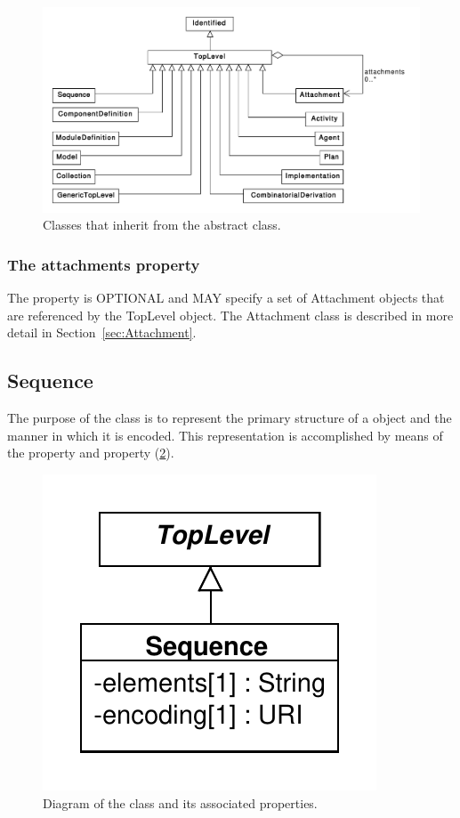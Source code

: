 \begin{figure}[ht]
\begin{center}
\includegraphics[width=\textwidth]{uml/toplevel}
\caption[]{Classes that inherit from the  abstract class.}
\label{uml:toplevel}
\end{center}
\end{figure}


\subsubsection*{The attachments property}
\label{sec:attachments}
The  property is OPTIONAL and MAY specify a set of Attachment objects that are referenced by the TopLevel object. The Attachment class is described in more detail in Section~\ref{sec:Attachment}.

\subsection{Sequence}
\label{sec:Sequence}
The purpose of the  class is to represent the primary structure of a  object and the manner in which it is encoded. This representation is accomplished  by means of the  property and  property (\ref{uml:sequence}).

\begin{figure}[ht]
\begin{center}
\includegraphics[scale=0.6]{uml/sequence}
\caption[]{Diagram of the  class and its associated properties.}
\label{uml:sequence}
\end{center}
\end{figure}


